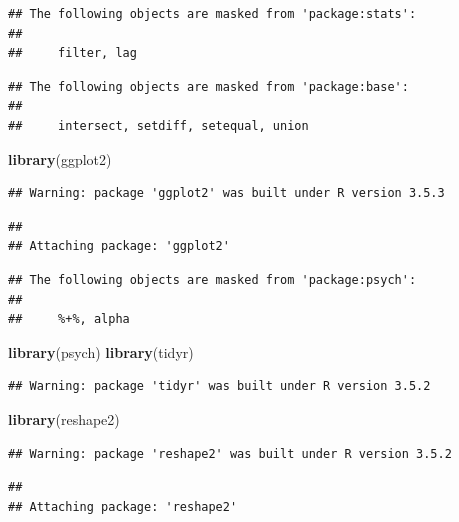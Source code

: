 \documentclass[]{article}
\newenvironment{Shaded}{\begin{snugshade}}{\end{snugshade}}
\newcommand{\KeywordTok}[1]{\textcolor[rgb]{0.13,0.29,0.53}{\textbf{#1}}}
\newcommand{\NormalTok}[1]{#1}
\begin{document}
\begin{verbatim}
## The following objects are masked from 'package:stats':
## 
##     filter, lag
\end{verbatim}

\begin{verbatim}
## The following objects are masked from 'package:base':
## 
##     intersect, setdiff, setequal, union
\end{verbatim}

\begin{Shaded}
\begin{Highlighting}[]
  \KeywordTok{library}\NormalTok{(ggplot2)}
\end{Highlighting}
\end{Shaded}

\begin{verbatim}
## Warning: package 'ggplot2' was built under R version 3.5.3
\end{verbatim}

\begin{verbatim}
## 
## Attaching package: 'ggplot2'
\end{verbatim}

\begin{verbatim}
## The following objects are masked from 'package:psych':
## 
##     %+%, alpha
\end{verbatim}

\begin{Shaded}
\begin{Highlighting}[]
  \KeywordTok{library}\NormalTok{(psych)}
  \KeywordTok{library}\NormalTok{(tidyr)}
\end{Highlighting}
\end{Shaded}

\begin{verbatim}
## Warning: package 'tidyr' was built under R version 3.5.2
\end{verbatim}

\begin{Shaded}
\begin{Highlighting}[]
  \KeywordTok{library}\NormalTok{(reshape2)}
\end{Highlighting}
\end{Shaded}

\begin{verbatim}
## Warning: package 'reshape2' was built under R version 3.5.2
\end{verbatim}

\begin{verbatim}
## 
## Attaching package: 'reshape2'
\end{verbatim}
\end{document}
